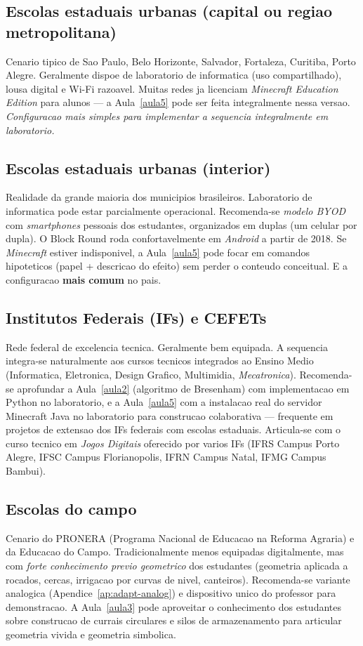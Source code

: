 \documentclass[12pt,a4paper]{scrartcl}
\newcommand{\acc}[1]{\textcolor{accent}{\textbf{#1}}}
\begin{document}
\subsection{Escolas estaduais urbanas (capital ou regiao metropolitana)}
Cenario tipico de Sao Paulo, Belo Horizonte, Salvador, Fortaleza, Curitiba, Porto Alegre. Geralmente dispoe de laboratorio de informatica (uso compartilhado), lousa digital e Wi-Fi razoavel. Muitas redes ja licenciam \emph{Minecraft Education Edition} para alunos --- a Aula~\ref{aula5} pode ser feita integralmente nessa versao. \emph{Configuracao mais simples para implementar a sequencia integralmente em laboratorio.}

\subsection{Escolas estaduais urbanas (interior)}
Realidade da grande maioria dos municipios brasileiros. Laboratorio de informatica pode estar parcialmente operacional. Recomenda-se \emph{modelo BYOD} com \emph{smartphones} pessoais dos estudantes, organizados em duplas (um celular por dupla). O Block Round roda confortavelmente em \emph{Android} a partir de 2018. Se \emph{Minecraft} estiver indisponivel, a Aula~\ref{aula5} pode focar em comandos hipoteticos (papel + descricao do efeito) sem perder o conteudo conceitual. E a configuracao \acc{mais comum} no pais.

\subsection{Institutos Federais (IFs) e CEFETs}
Rede federal de excelencia tecnica. Geralmente bem equipada. A sequencia integra-se naturalmente aos cursos tecnicos integrados ao Ensino Medio (Informatica, Eletronica, Design Grafico, Multimidia, \emph{Mecatronica}). Recomenda-se aprofundar a Aula~\ref{aula2} (algoritmo de Bresenham) com implementacao em Python no laboratorio, e a Aula~\ref{aula5} com a instalacao real do servidor Minecraft Java no laboratorio para construcao colaborativa --- frequente em projetos de extensao dos IFs federais com escolas estaduais. Articula-se com o curso tecnico em \emph{Jogos Digitais} oferecido por varios IFs (IFRS Campus Porto Alegre, IFSC Campus Florianopolis, IFRN Campus Natal, IFMG Campus Bambui).

\subsection{Escolas do campo}
Cenario do PRONERA (Programa Nacional de Educacao na Reforma Agraria) e da Educacao do Campo. Tradicionalmente menos equipadas digitalmente, mas com \emph{forte conhecimento previo geometrico} dos estudantes (geometria aplicada a rocados, cercas, irrigacao por curvas de nivel, canteiros). Recomenda-se variante analogica (Apendice~\ref{ap:adapt-analog}) e dispositivo unico do professor para demonstracao. A Aula~\ref{aula3} pode aproveitar o conhecimento dos estudantes sobre construcao de currais circulares e silos de armazenamento para articular geometria vivida e geometria simbolica.
\end{document}
